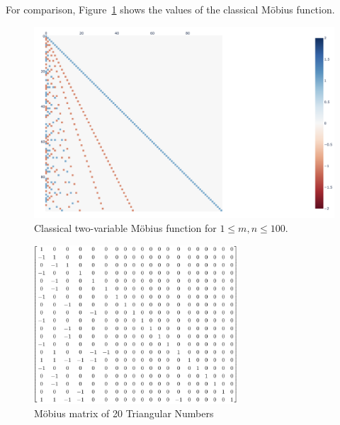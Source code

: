 \documentclass{amsart}
\theoremstyle{definition}
\newcommand{\Mobius}{M\"obius}
\begin{document}
For comparison, Figure~\ref{fig:mobius-heatmap-classical} shows the values of the classical \Mobius{} function.
\begin{figure}[h!]
    \centering
    \includegraphics[width = 6in]{Plotly_classical-final.png}
    \caption{Classical two-variable \Mobius{} function for $1 \leq m, n \leq 100$.}
    \label{fig:mobius-heatmap-classical}
\end{figure}

\begin{figure}[h!]
    \centering
    \includegraphics[width = 3in]{Mobius_Matrix_20.PNG}
    \caption{\Mobius{} matrix of 20 Triangular Numbers}
    \label{fig:mobius-matrix-20}
\end{figure}
\end{document}

